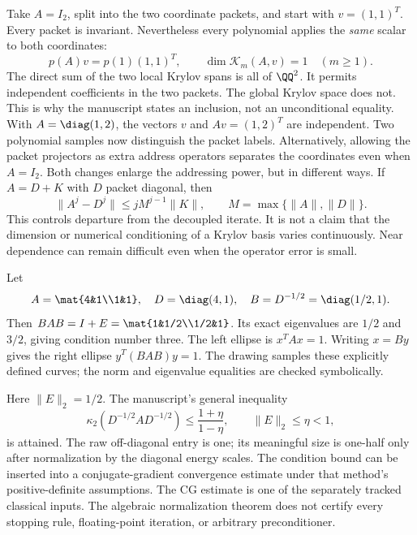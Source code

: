 Take $A=I_2$, split into the two coordinate packets, and start with $v=(1,1)^T$. Every packet is invariant. Nevertheless every polynomial applies the \emph{same} scalar to both coordinates:
\[
p(A)v=p(1)(1,1)^T,\qquad \dim\mathcal K_m(A,v)=1\quad(m\ge1).
\]
The direct sum of the two local Krylov spans is all of $\QQ^2$. It permits independent coefficients in the two packets. The global Krylov space does not. This is why the manuscript states an inclusion, not an unconditional equality.
With $A=\diag(1,2)$, the vectors $v$ and $Av=(1,2)^T$ are independent. Two polynomial samples now distinguish the packet labels. Alternatively, allowing the packet projectors as extra address operators separates the coordinates even when $A=I_2$. Both changes enlarge the addressing power, but in different ways.
If $A=D+K$ with $D$ packet diagonal, then
\[
\|A^j-D^j\|\le jM^{j-1}\|K\|,
\qquad M=\max\{\|A\|,\|D\|\}.
\]
This controls departure from the decoupled iterate. It is not a claim that the dimension or numerical conditioning of a Krylov basis varies continuously. Near dependence can remain difficult even when the operator error is small.

Let
\[
A=\mat{4&1\\1&1},\quad D=\diag(4,1),\quad
B=D^{-1/2}=\diag(1/2,1).
\]
Then $BAB=I+E=\mat{1&1/2\\1/2&1}$. Its exact eigenvalues are $1/2$ and $3/2$, giving condition number three.
The left ellipse is $x^TAx=1$. Writing $x=By$ gives the right ellipse $y^T(BAB)y=1$. The drawing samples these explicitly defined curves; the norm and eigenvalue equalities are checked symbolically.

Here $\|E\|_2=1/2$. The manuscript's general inequality
\[
\kappa_2(D^{-1/2}AD^{-1/2})
\le\frac{1+\eta}{1-\eta},\qquad \|E\|_2\le\eta<1,
\]
is attained. The raw off-diagonal entry is one; its meaningful size is one-half only after normalization by the diagonal energy scales.
The condition bound can be inserted into a conjugate-gradient convergence estimate under that method's positive-definite assumptions. The CG estimate is one of the separately tracked classical inputs. The algebraic normalization theorem does not certify every stopping rule, floating-point iteration, or arbitrary preconditioner.

